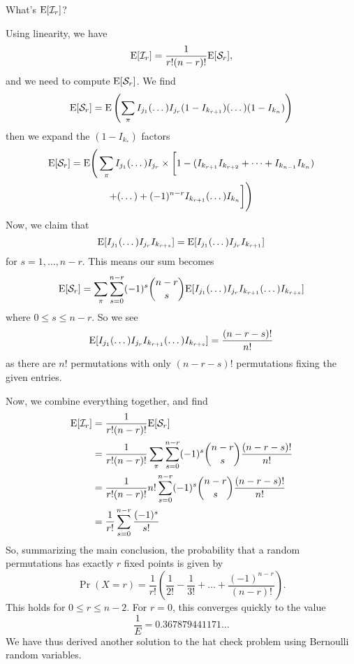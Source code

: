 What's $\mathrm{E}[\mathcal{I}_{r}]$?

\medbreak
Using linearity, we have
\begin{equation}
\mathrm{E}[\mathcal{I}_r]=\frac{1}{r!(n-r)!}\mathrm{E}[\mathcal{S}_{r}],
\end{equation}
and we need to compute $\mathrm{E}[\mathcal{S}_{r}]$. We find
\begin{equation}
\mathrm{E}[\mathcal{S}_r] = \mathrm{E}\left(\sum_{\pi}I_{j_1}(\dots)I_{j_r}(1-I_{k_{r+1}})(\dots)(1-I_{k_n})\right)
\end{equation}
then we expand the $(1-I_{k_{\textstyle *}})$ factors
\begin{multline}
\mathrm{E}[\mathcal{S}_r] = \mathrm{E}\Bigg(\sum_{\pi}I_{j_1}(\dots)I_{j_r}
\times\biggl[1-(I_{k_{r+1}}I_{k_{r+2}}+\dots+I_{k_{n-1}}I_{k_n}) \\
+(\dots)+(-1)^{n-r}I_{k_{r+1}}(\dots)I_{k_n}\biggr]\Bigg)
\end{multline}
Now, we claim that
\begin{equation}
\mathrm{E}[I_{j_1}(\dots)I_{j_{r}}I_{k_{r+s}}]=\mathrm{E}[I_{j_1}(\dots)I_{j_{r}}I_{k_{r+1}}]
\end{equation}
for $s=1,\dots,n-r$. This means our sum becomes
\begin{equation}
\mathrm{E}[\mathcal{S}_r]=\sum_{\pi}\sum^{n-r}_{s=0}(-1)^{s}\binom{n-r}{s}
\mathrm{E}[I_{j_1}(\dots)I_{j_r}I_{k_{r+1}}(\dots)I_{k_{r+s}}]
\end{equation}
where $0\leq s\leq n-r$. So we see
\begin{equation}
\mathrm{E}[I_{j_1}(\dots)I_{j_r}I_{k_{r+1}}(\dots)I_{k_{r+s}}]=\frac{(n-r-s)!}{n!}
\end{equation}
as there are $n!$ permutations with only $(n-r-s)!$ permutations fixing the 
given entries.

Now, we combine everything together, and find
\begin{subequations}
\begin{align}
\mathrm{E}[\mathcal{I}_r] &=
\frac{1}{r!(n-r)!}\mathrm{E}[\mathcal{S}_r]\\
&=\frac{1}{r!(n-r)!}\sum_{\pi}\sum^{n-r}_{s=0}(-1)^{s}\binom{n-r}{s}\frac{(n-r-s)!}{n!}\\
&=\frac{1}{r!(n-r)!}n!\sum^{n-r}_{s=0}(-1)^{s}\binom{n-r}{s}\frac{(n-r-s)!}{n!}\\
&=\frac{1}{r!}\sum^{n-r}_{s=0}\frac{(-1)^{s}}{s!}
\end{align}
\end{subequations}
So, summarizing the main conclusion, the probability that a random permutations 
has exactly $r$ fixed points is given by
\begin{equation}
\Pr(X=r)=\frac{1}{r!}\left(\frac{1}{2!}-\frac{1}{3!}+\dots+\frac{(-1)^{n-r}}{(n-r)!}\right).
\end{equation}
This holds for $0\leq r\leq n-2$. For $r=0$, this converges quickly to the value
\begin{equation}
\frac{1}{E}=0.367 879 441 171\dots
\end{equation}
We have thus derived another solution to the hat check problem using Bernoulli 
random variables.

